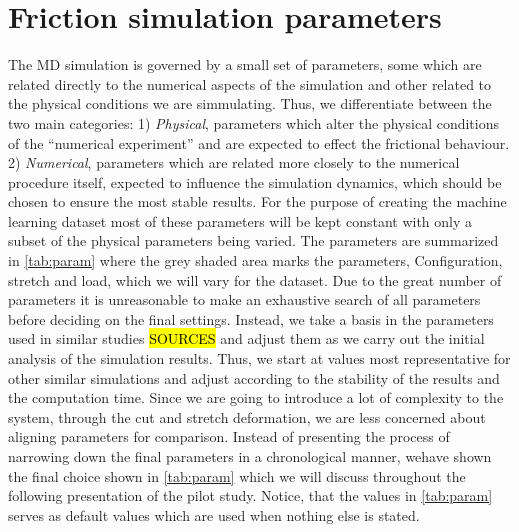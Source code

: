 \section{Friction simulation parameters}
The \acrshort{MD} simulation is governed by a small set of parameters, some
which are related directly to the numerical aspects of the simulation and other related
to the physical conditions we are simmulating. Thus, we differentiate between
the two main categories: 1) \textit{Physical}, parameters which alter the
physical conditions of the ``numerical experiment'' and are expected to effect
the frictional behaviour. 2) \textit{Numerical}, parameters which are related
more closely to the numerical procedure itself, expected to influence the
simulation dynamics, which should be chosen to ensure the most stable results.
For the purpose of creating the machine learning dataset most of these
parameters will be kept constant with only a subset of the physical parameters
being varied. The parameters are summarized in \cref{tab:param} where the grey
shaded area marks the parameters, Configuration, stretch and load, which we will vary for the dataset. Due to the great number of parameters it is unreasonable to make an exhaustive search of all parameters before deciding on the final settings. Instead, we take a basis in the parameters used in similar studies \hl{SOURCES} and adjust them as
we carry out the initial analysis of the simulation results. Thus, we start at values
most representative for other similar simulations and adjust according to the
stability of the results and the computation time. Since we are going to
introduce a lot of complexity to the system, through the cut and stretch
deformation, we are less concerned about aligning parameters for comparison. Instead of presenting the process of narrowing down the final parameters in a chronological manner, wehave shown the final choice shown in \cref{tab:param} which we will discuss throughout the following presentation of the pilot study. Notice, that the values in \cref{tab:param} serves as default values which are used when nothing else is stated.





